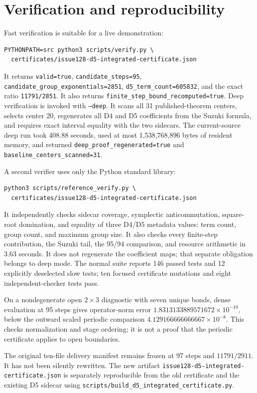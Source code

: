 \documentclass[10pt]{article}
\newcommand{\code}[1]{\texttt{#1}}
\begin{document}
\section{Verification and reproducibility}

Fast verification is suitable for a live demonstration:
\begin{verbatim}
PYTHONPATH=src python3 scripts/verify.py \
  certificates/issue128-d5-integrated-certificate.json
\end{verbatim}
It returns \code{valid=true}, \code{candidate\_steps=95},
\code{candidate\_group\_exponentials=2851},
\code{d5\_term\_count=605832}, and the exact ratio
\code{11791/2851}.  It also returns
\code{finite\_step\_bound\_recomputed=true}.  Deep verification is invoked
with \code{--deep}.  It scans all 31 published-theorem centers, selects center
20, regenerates all D4 and D5 coefficients from the Suzuki formula, and
requires exact interval equality with the two sidecars.  The current-source
deep run took 408.88 seconds, used at most 1,538,768,896 bytes of resident
memory, and returned \code{deep\_proof\_regenerated=true} and
\code{baseline\_centers\_scanned=31}.

A second verifier uses only the Python standard library:
\begin{verbatim}
python3 scripts/reference_verify.py \
  certificates/issue128-d5-integrated-certificate.json
\end{verbatim}
It independently checks sidecar coverage, symplectic anticommutation,
square-root domination, and equality of three D4/D5 metadata values: term
count, group count, and maximum group size.  It also checks every finite-step
contribution, the Suzuki tail, the 95/94 comparison, and resource arithmetic
in 3.63 seconds.  It does not regenerate the coefficient maps; that separate
obligation belongs to deep mode.  The normal suite reports 146 passed tests
and 12 explicitly deselected slow tests; ten focused certificate mutations
and eight independent-checker tests pass.

On a nondegenerate open $2\times3$ diagnostic with seven unique bonds, dense
evaluation at 95 steps gives operator-norm error
$1.8313133889571672\times10^{-10}$, below the outward scaled periodic
comparison $4.129166666666667\times10^{-8}$.  This checks normalization and
stage ordering; it is not a proof that the periodic certificate applies to
open boundaries.

The original ten-file delivery manifest remains frozen at 97 steps and
$11791/2911$.  It has not been silently rewritten.  The new artifact
\code{issue128-d5-integrated-certificate.json} is separately reproducible from
the old certificate and the existing D5 sidecar using
\code{scripts/build\_d5\_integrated\_certificate.py}.
\end{document}
